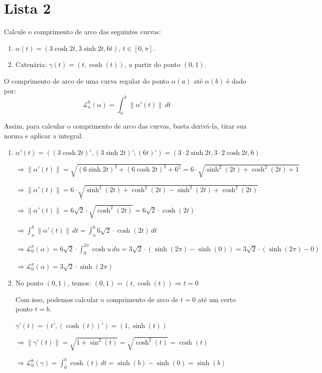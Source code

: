 \documentclass[../main.tex]{subfiles}
\begin{document}
	
	\section{Lista 2}


\begin{exercicio}{1}
	Calcule o comprimento de arco das seguintes curvas:
	
	\begin{enumerate}[label=\alph*)]
		\item $\alpha(t) = (3\cosh{2t}, 3\sinh{2t},6t)$, $t\in [0,\pi]$.
		\item Catenária: $\gamma(t)=(t,\cosh(t))$, a partir do ponto $(0,1)$.
	\end{enumerate}
\end{exercicio}

\begin{solucao}
	\begin{definicao}
		O comprimento de arco de uma curva regular do ponto $\alpha(a)$ até $\alpha(b)$ é dado por:
		\[
		\mathcal{L}_a^b(\alpha)=\int_a^b \|\alpha'(t)\|\,dt
		\]
	\end{definicao}
	
	Assim, para calcular o comprimento de arco das curvas, basta derivá-la, tirar sua norma e aplicar a integral.
	
	\begin{enumerate}[label=\alph*)]
		\item $\alpha'(t)=((3\cosh{2t})',(3\sinh{2t})',(6t)')=(3\cdot 2\sinh{2t},3\cdot 2\cosh{2t}, 6)$
		
		$\Rightarrow \|\alpha'(t)\|=\sqrt{(6\sinh{2t})^2+(6\cosh{2t})^2+6^2}=6\cdot \sqrt{\sinh^2(2t)+\cosh^2(2t)+1}$
		
		$\Rightarrow \|\alpha'(t)\|=6\cdot \sqrt{\sinh^2(2t)+\cosh^2(2t)-\sinh^2(2t)+\cosh^2(2t)}$
		
		$\Rightarrow \|\alpha'(t)\|=6\sqrt{2}\cdot \sqrt{\cosh^2(2t)}=6\sqrt{2}\cdot \cosh(2t)$
		
		$\Rightarrow \int_a^b \|\alpha'(t)\|\,dt=\int_a^b 6\sqrt{2}\cdot \cosh(2t)\,dt$
		
		$\Rightarrow \mathcal{L}_0^\pi(\alpha)=6\sqrt{2}\cdot \int_0^{2\pi} \cosh{u}\, du=3\sqrt{2}\cdot (\sinh(2\pi)-\sinh(0))=3\sqrt{2}\cdot (\sinh(2\pi)-0)$
		
		$\Rightarrow \mathcal{L}_0^\pi(\alpha)=3\sqrt{2}\cdot \sinh(2\pi)$
		
		\item No ponto $(0,1)$, temos:
		$(0,1)=(t,\cosh(t))\Rightarrow t=0$
		
		Com isso, podemos calcular o comprimento de arco de $t=0$ até um certo ponto $t=b$.
		
		$\gamma'(t)=(t', (\cosh(t))')=(1,\sinh(t))$
		
		$\Rightarrow \|\gamma'(t)\|=\sqrt{1+\sin^2(t)}=\sqrt{\cosh^2(t)}=\cosh(t)$
		
		$\Rightarrow \mathcal{L}_0^b(\gamma)=\int_0^b \cosh(t)\,dt=\sinh(b)-\sinh(0)=\sinh(b)$
		
	\end{enumerate}
\end{solucao}
\end{document}

